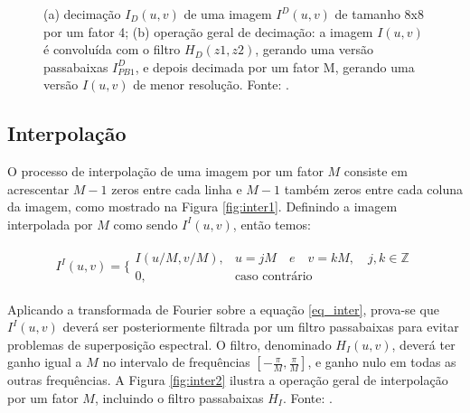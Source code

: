\begin{figure}[h]
    \centering
    \qquad
    \caption{(a) decimação $I_D(u,v)$ de uma imagem $I^D(u,v)$ de tamanho 8x8 por um fator 4; (b) operação geral de decimação: a imagem $I(u,v)$ é convoluída com o filtro $H_D(z1,z2)$, gerando uma versão passabaixas $I^D_{PB1}$, e depois decimada por um fator M, gerando uma versão $I(u,v)$ de menor resolução. Fonte: \cite{garcia2013tecnicas}. }%
	    
\end{figure}

\subsection{Interpolação}

    O processo de interpolação de uma imagem por um fator $M$ consiste em acrescentar $M-1$ zeros entre cada linha e $M-1$ também zeros entre cada coluna da imagem, como mostrado na Figura \ref{fig:inter1}. Definindo a imagem interpolada por $M$ como sendo $I^I(u,v)$, então temos:

\begin{equation}
\begin{matrix}
	I^I(u,v)=\Bigg\{
	\begin{matrix}
		I(u/M,v/M), & u = jM \quad e \quad v = kM, \quad j,k \in  \mathbb{Z}\\ 
		0, &  \textrm{caso contrário}
	\end{matrix}
\end{matrix}
\label{eq_inter}
\end{equation}


Aplicando a transformada de Fourier sobre a equação \ref{eq_inter}, prova-se que $I^I(u,v)$ deverá ser posteriormente filtrada por um filtro passabaixas para evitar problemas de superposição espectral. O filtro, denominado $H_I(u,v)$, deverá ter ganho igual a $M$ no intervalo de frequências $\left[-\frac{\pi}{M},\frac{\pi}{M} \right]$, e ganho nulo em todas as outras frequências. A Figura \ref{fig:inter2} ilustra a operação geral de interpolação por um fator $M$, incluindo o filtro passabaixas $H_I$. Fonte: \cite{garcia2013tecnicas}. 


